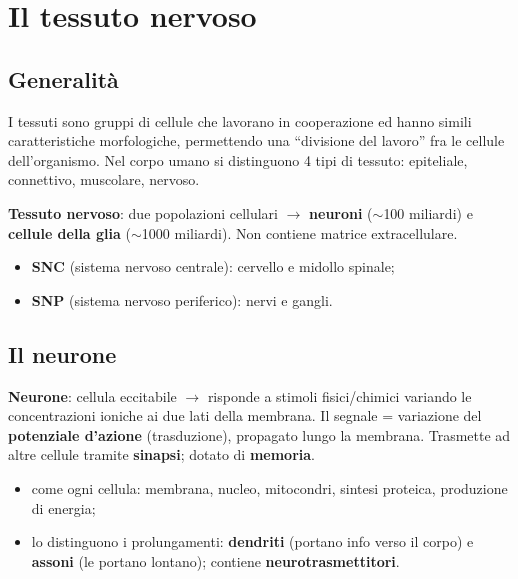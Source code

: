 \chapter{Il tessuto nervoso}

\section{Generalità}

I tessuti sono gruppi di cellule che lavorano in cooperazione ed hanno simili caratteristiche
morfologiche, permettendo una ``divisione del lavoro'' fra le cellule dell'organismo. Nel corpo
umano si distinguono 4 tipi di tessuto: epiteliale, connettivo, muscolare, nervoso.

\textbf{Tessuto nervoso}: due popolazioni cellulari $\rightarrow$ \textbf{neuroni} ($\sim$100
miliardi) e \textbf{cellule della glia} ($\sim$1000 miliardi). Non contiene matrice extracellulare.
\begin{itemize}
  \item \textbf{SNC} (sistema nervoso centrale): cervello e midollo spinale;
  \item \textbf{SNP} (sistema nervoso periferico): nervi e gangli.
\end{itemize}

\section{Il neurone}

\textbf{Neurone}: cellula eccitabile $\rightarrow$ risponde a stimoli fisici/chimici variando le
concentrazioni ioniche ai due lati della membrana. Il segnale = variazione del \textbf{potenziale
d'azione} (trasduzione), propagato lungo la membrana. Trasmette ad altre cellule tramite
\textbf{sinapsi}; dotato di \textbf{memoria}.
\begin{itemize}
  \item come ogni cellula: membrana, nucleo, mitocondri, sintesi proteica, produzione di energia;
  \item lo distinguono i prolungamenti: \textbf{dendriti} (portano info verso il corpo) e
    \textbf{assoni} (le portano lontano); contiene \textbf{neurotrasmettitori}.
\end{itemize}

